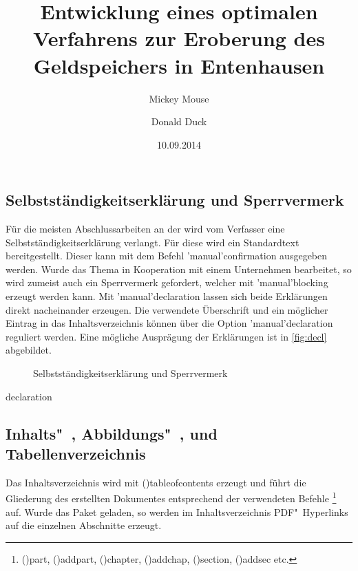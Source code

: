 \documentclass[%
  english,ngerman,%
  cdgeometry=no,DIV=12,%
  cd=false,cdfont=false,cdtitle=true,%
  headings=normal,%
  automark,%
  listof=toc,%
]{tudscrartcl}
\begin{document}
\subsection{Selbstständigkeitserklärung und Sperrvermerk}

Für die meisten Abschlussarbeiten an der \TnUD wird vom Verfasser eine 
Selbstständigkeitserklärung verlangt. Für diese wird ein Standardtext 
bereitgestellt. Dieser kann mit dem Befehl \Macro'manual'{confirmation} 
ausgegeben werden. Wurde das Thema in Kooperation mit einem Unternehmen 
bearbeitet, so wird zumeist auch ein Sperrvermerk gefordert, welcher mit 
\Macro'manual'{blocking} erzeugt werden kann. Mit \Macro'manual'{declaration} 
lassen sich beide Erklärungen direkt nacheinander erzeugen. Die verwendete 
Überschrift und ein möglicher Eintrag in das Inhaltsverzeichnis können über die 
Option \Option'manual'{declaration} reguliert werden. Eine mögliche Ausprägung 
der Erklärungen ist in \autoref{fig:decl} abgebildet.
%
\begin{figure}
\centering
{}
\caption{%
  Selbstständigkeitserklärung und Sperrvermerk%
  \label{fig:decl}%
}
\end{figure}

\begin{Hint!}{declaration}
\title{%
  Entwicklung eines optimalen Verfahrens zur Eroberung des
  Geldspeichers in Entenhausen
}
\author{Mickey Mouse\and Donald Duck}
\date{10.09.2014}
\declaration[company=FIRMA]
\end{Hint!}
\begin{Trunk+}
\declaration[company=FIRMA]

\end{Trunk+}



\subsection{Inhalts"~, Abbildungs"~, und Tabellenverzeichnis}

Das Inhaltsverzeichnis wird mit \Macro(){tableofcontents} 
erzeugt und führt die Gliederung des erstellten Dokumentes entsprechend der 
verwendeten Befehle%
\footnote{%
  \Macro(){part},
  \Macro(){addpart}, 
  \Macro(){chapter}, 
  \Macro(){addchap}, 
  \Macro(){section},
  \Macro(){addsec} etc.%
}
auf. Wurde das Paket  geladen, so werden im 
Inhaltsverzeichnis PDF"~Hyperlinks auf die einzelnen Abschnitte erzeugt.
\end{document}
